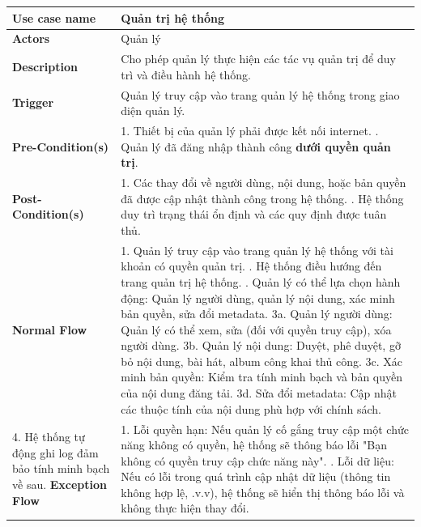 \documentclass[a4paper]{article}
\newcommand{\cach}{\hspace*{1.5em}\ignorespaces}
\begin{document}
\begin{table}[h!]
\centering
\renewcommand{\arraystretch}{1.3} %
\begin{tabularx}{\textwidth}{|l|X|}
\hline
\textbf{Use case name} & Quản trị hệ thống \\ \hline
\textbf{Actors}        & Quản lý \\ \hline
\textbf{Description}   & Cho phép quản lý thực hiện các tác vụ quản trị để duy trì và điều hành hệ thống. \\ \hline
\textbf{Trigger}       & Quản lý truy cập vào trang quản lý hệ thống trong giao diện quản lý. \\ \hline
\textbf{Pre-Condition(s)} 
& 1. Thiết bị của quản lý phải được kết nối internet. \newline
  2. Quản lý đã đăng nhập thành công \textbf{dưới quyền quản trị}. \\ \hline
\textbf{Post-Condition(s)} 
& 1. Các thay đổi về người dùng, nội dung, hoặc bản quyền đã được cập nhật thành công trong hệ thống. \newline
  2. Hệ thống duy trì trạng thái ổn định và các quy định được tuân thủ. \\ \hline
\textbf{Normal Flow}   
& 1. Quản lý truy cập vào trang quản lý hệ thống với tài khoản có quyền quản trị. \newline
  2. Hệ thống điều hướng đến trang quản trị hệ thống. \newline
  3. Quản lý có thể lựa chọn hành động: Quản lý người dùng, quản lý nội dung, xác minh bản quyền, sửa đổi metadata. \newline
  \cach 3a. Quản lý người dùng: Quản lý có thể xem, sửa (đối với quyền truy cập), xóa người dùng. \newline
  \cach 3b. Quản lý nội dung: Duyệt, phê duyệt, gỡ bỏ nội dung, bài hát, album công khai thủ công. \newline
  \cach 3c. Xác minh bản quyền: Kiểm tra tính minh bạch và bản quyền của nội dung đăng tải. \newline
  \cach 3d. Sửa đổi metadata: Cập nhật các thuộc tính của nội dung phù hợp với chính sách. \\ \hline
  4. Hệ thống tự động ghi log đảm bảo tính minh bạch về sau.
\textbf{Exception Flow} 
& 1. Lỗi quyền hạn: Nếu quản lý cố gắng truy cập một chức năng không có quyền, hệ thống sẽ thông báo lỗi "Bạn không có quyền truy cập chức năng này". \newline
  2. Lỗi dữ liệu: Nếu có lỗi trong quá trình cập nhật dữ liệu (thông tin không hợp lệ, .v.v), hệ thống sẽ hiển thị thông báo lỗi và không thực hiện thay đổi. \newline

\end{tabularx}
\end{table}
\end{document}
